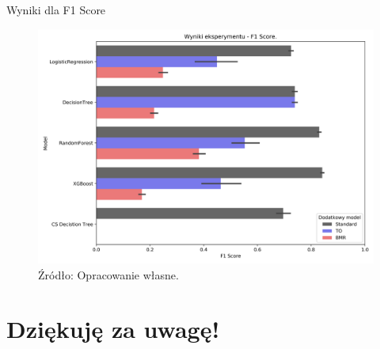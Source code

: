 \documentclass{beamer}
\begin{document}
\begin{frame}{Wyniki dla F1 Score}
	\begin{figure}
		\includegraphics[width=0.8\linewidth]{images/100_config1-F1.png}
		\caption{Źródło: Opracowanie własne.}
	\end{figure}
\end{frame}

\section[]{Dziękuję za uwagę!}
\end{document}
